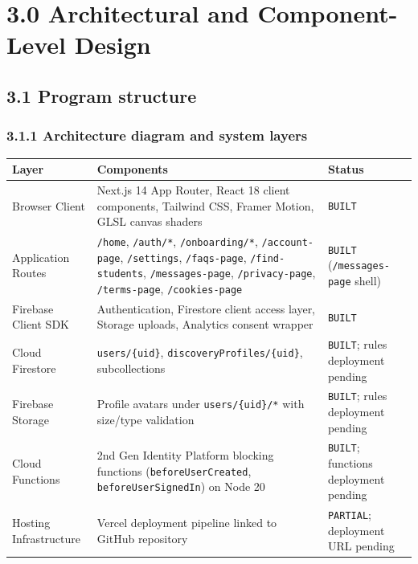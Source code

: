 \documentclass[11pt,letterpaper]{article}
\begin{document}
\newpage
\section*{3.0 Architectural and Component-Level Design}

\subsection*{3.1 Program structure}

\subsubsection*{3.1.1 Architecture diagram and system layers}

\begin{table}[h!]
\centering
\small
\begin{tabularx}{\textwidth}{p{2.8cm} Y p{2.8cm}}
\toprule
\textbf{Layer} & \textbf{Components} & \textbf{Status} \\
\midrule
Browser Client & Next.js 14 App Router, React 18 client components, Tailwind CSS, Framer Motion, GLSL canvas shaders & \texttt{BUILT} \\
Application Routes & \texttt{/home}, \texttt{/auth/*}, \texttt{/onboarding/*}, \texttt{/account-page}, \texttt{/settings}, \texttt{/faqs-page}, \texttt{/find-students}, \texttt{/messages-page}, \texttt{/privacy-page}, \texttt{/terms-page}, \texttt{/cookies-page} & \texttt{BUILT} (\texttt{/messages-page} shell) \\
Firebase Client SDK & Authentication, Firestore client access layer, Storage uploads, Analytics consent wrapper & \texttt{BUILT} \\
Cloud Firestore & \texttt{users/\{uid\}}, \texttt{discoveryProfiles/}\allowbreak\texttt{\{uid\}}, subcollections & \texttt{BUILT}; rules deployment pending \\
Firebase Storage & Profile avatars under \texttt{users/\{uid\}/*} with size/type validation & \texttt{BUILT}; rules deployment pending \\
Cloud Functions & 2nd Gen Identity Platform blocking functions (\texttt{beforeUser}\allowbreak\texttt{Created}, \texttt{beforeUser}\allowbreak\texttt{SignedIn}) on Node 20 & \texttt{BUILT}; functions deployment pending \\
Hosting Infrastructure & Vercel deployment pipeline linked to GitHub repository & \texttt{PARTIAL}; deployment URL pending \\
\bottomrule
\end{tabularx}
\end{table}
\end{document}
